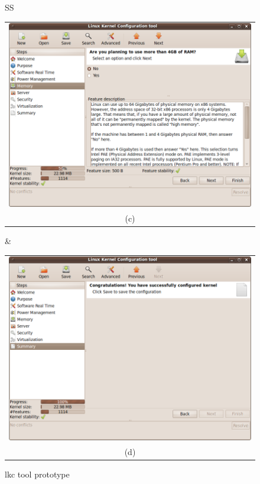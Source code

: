 \documentclass{chi2009}
\begin{document}
\begin{figure}[!t]
\begin{tabular}{SS}
 \begin{tabular}{c}
  \includegraphics[scale=0.25,keepaspectratio=true]{figs/lkc-final3} \\
  (c) \\
 \end{tabular}
  & 
\begin{tabular}{c}
  \includegraphics[scale=0.25,keepaspectratio=true]{figs/lkc-final4} \\
  (d) \\
 \end{tabular}
\end{tabular}
\caption{\textsf{lkc} tool prototype}
\label{fig:lkc-final}
\end{figure}
\end{document}
